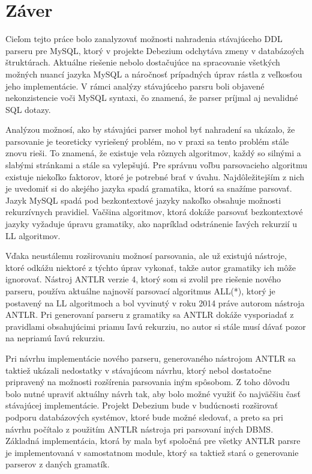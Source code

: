 \chapter{Záver}
Cieľom tejto práce bolo zanalyzovať možnosti nahradenia stávajúceho DDL parseru pre MySQL, ktorý v projekte Debezium odchytáva zmeny v databázoých štruktúrach. Aktuálne riešenie nebolo dostačujúce na spracovanie všetkých možných nuancí jazyka MySQL a náročnosť prípadných úprav rástla z veľkosťou jeho implementácie. V rámci analýzy stávajúceho parsru boli objavené nekonzistencie voči MySQL syntaxi, čo znamená, že parser príjmal aj nevalidné SQL dotazy.

Analýzou možnosí, ako by stávajúci parser mohol byť nahradení sa ukázalo, že parsovanie je teoreticky vyriešený problém, no v praxi sa tento problém stále znovu rieši. To znamená, že existuje vela rôznych algoritmov, každý so silnými a slabými stránkami a stále sa vylepšujú. Pre správnu voľbu parsovacieho algoritmu existuje niekoľko faktorov, ktoré je potrebné brať v úvahu. Najdôležitejším z nich je uvedomiť si do akejého jazyka spadá gramatika, ktorú sa snažíme parsovať. Jazyk MySQL spadá pod bezkontextové jazyky nakoľko obsahuje možnosti rekurzívnych pravidiel. Vačšina algoritmov, ktorá dokáže parsovať bezkontextové jazyky vyžaduje úpravu gramatiky, ako napríklad odstránenie ľavých rekurzií u LL algoritmov. 

Vďaka neustálemu rozširovaniu možnosí parsovania, ale už existujú nástroje, ktoré odkážu niektoré z týchto úprav vykonať, takže autor gramatiky ich môže ignorovať. Nástroj ANTLR verzie 4, ktorý som si zvolil pre riešenie nového parseru, používa aktuálne najnovší parsovací algoritmus ALL(*), ktorý je postavený na LL algoritmoch a bol vyvinutý v roku 2014 práve autorom nástroja ANTLR. Pri generovaní parseru z gramatiky sa ANTLR dokáže vysporiadať z pravidlami obsahujúcimi priamu ľavú rekurziu, no autor si stále musí dávať pozor na nepriamú ľavú rekurziu.

Pri návrhu implementácie nového parseru, generovaného nástrojom ANTLR sa taktiež ukázali nedostatky v stávajúcom návrhu, ktorý nebol dostatočne pripravený na možnosti rozšírenia parsovania iným spôsobom. Z toho dôvodu bolo nutné upraviť aktuálny návrh tak, aby bolo možné využiť čo najväčšiu časť stávajúcej implementácie. Projekt Debezium bude v budúcnosti rozširovať podporu databázových systémov, ktoré bude možné sledovať, a preto sa pri návrhu počítalo z použitím ANTLR nástroja pri parsovaní iných DBMS. Základná implementácia, ktorá by mala byť spoločná pre všetky ANTLR parsre je implementovaná v samostatnom module, ktorý sa taktiež stará o generovanie parserov z daných gramatík.

